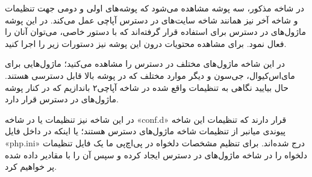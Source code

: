 در شاخه مذکور، سه پوشه مشاهده می‌شود که پوشه‌های اولی و دومی جهت تنظیمات و شاخه آخر نیز همانند شاخه سایت‌های در دسترس آپاچی عمل می‌کند. در این پوشه ماژول‌های در دسترس برای استفاده قرار گرفته‌اند که با دستور خاصی، می‌توان آنان را فعال نمود. برای مشاهده محتویات درون این پوشه نیز دستورات زیر را اجرا کنید.
\newline
\begin{latin}  
    
\end{latin}
در این شاخه ماژول‌های مختلف در دسترس را مشاهده می‌کنید؛ ماژول‌هایی برای مای‌اس‌کیوال، جی‌سون و دیگر موارد مختلف که در پوشه بالا قابل دسترسی هستند. حال بیایید نگاهی به تنظیمات واقع شده در شاخه آپاچی۲ باندازیم که در کنار پوشه ماژول‌های در دسترس قرار دارد.
\newline
\begin{latin}  
    
\end{latin}
در این شاخه نیز تنظیمات یا در شاخه «conf.d» قرار دارند که تنظیمات این شاخه پیوندی میانبر از تنظیمات شاخه ماژول‌های دسترس هستند؛ یا اینکه در داخل فایل «php.ini» درج شده‌اند. برای تنظیم مشخصات دلخواه در پی‌اچ‌پی ما یک فایل تنظیمات دلخواه را در شاخه ماژول‌های در دسترس ایجاد کرده و سپس آن را با مقادیر داده شده پر خواهیم کرد.
\newline
\begin{latin}  
    
\end{latin}

